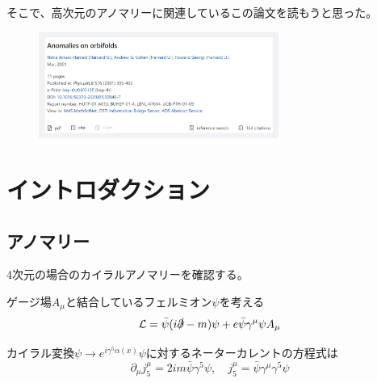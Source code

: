 \documentclass[
  unicode,a4paper,10pt,
  xcolor = {dvipsnames,svgnames},
  hyperref ={colorlinks=true,citecolor=Navy,linkcolor=NavyBlue,urlcolor=purple},
  ja=standard,lualatex
]{beamer}
\begin{document}
\begin{frame}

  そこで、高次元のアノマリーに関連しているこの論文を読もうと思った。
  \begin{figure}[ht]
    \centering
    \includegraphics[width=0.7\textwidth]{fig/Arkani-Hamed2001uol.png}
  \end{figure}

\end{frame}


\section{イントロダクション}

\begin{frame}[plain]
  \huge \secname
\end{frame}

\subsection{アノマリー}

\begin{frame}{\subsecname}

  4次元の場合のカイラルアノマリーを確認する。

  \pause
  \vspace*{10pt}

  ゲージ場$A_{\mu}$と結合しているフェルミオン$\psi$を考える
  \begin{equation}
    \mathcal{L}
    =
    \bar{\psi}(i\slashed{\partial}-m)\psi
    +
    e\bar{\psi}\gamma^{\mu}\psi A_{\mu}
    \nonumber
  \end{equation}

  \vspace*{10pt}

  カイラル変換$\psi\rightarrow e^{i\gamma^{5}\alpha(x)}\psi$に対するネーターカレントの方程式は
  \begin{equation}
    \partial_{\mu}j^{\mu}_{5}
    =
    2im\bar{\psi}\gamma^{5}\psi
    ,\quad
    j^{\mu}_{5}
    =
    \bar{\psi}\gamma^{\mu}\gamma^{5}\psi
    \nonumber
  \end{equation}

\end{frame}
\end{document}
